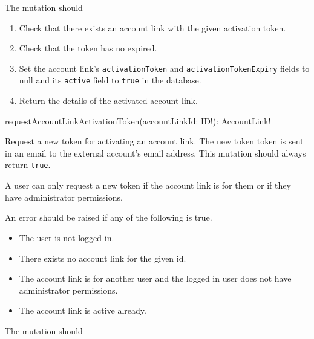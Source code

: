 \functionality

The mutation should

\begin{enumerate}
    \item Check that there exists an account link with the given activation token.
    \item Check that the token has no expired.
    \item Set the account link's \verb|activationToken| and \verb|activationTokenExpiry| fields to null and its \verb|active| field to \verb|true| in the database.
    \item Return the details of the activated account link.
\end{enumerate}


\begin{code}
requestAccountLinkActivationToken(accountLinkId: ID!): AccountLink!
\end{code}

Request a new token for activating an account link. The new token token is sent in an email to the external account's email address. This mutation should always return \verb|true|.

\restrictions

A user can only request a new token if the account link is for them or if they have administrator permissions.

\errors

An error should be raised if any of the following is true.

\begin{itemize}
    \item The user is not logged in.
    \item There exists no account link for the given id.
    \item The account link is for another user and the logged in user does not have administrator permissions.
    \item The account link is active already.
\end{itemize}

\functionality

The mutation should

